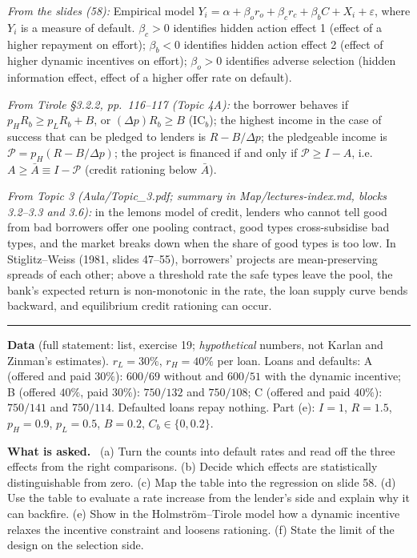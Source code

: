 \documentclass[11pt,a4paper]{article}
\newcommand{\asked}{\par\medskip\noindent\textbf{What is asked.}~}
\newcommand{\stmtend}{\par\endgroup\nopagebreak\noindent\rule{\linewidth}{0.4pt}\par\medskip}
\begin{document}
\emph{From the slides (58):} Empirical model
\(Y_i = \alpha + \beta_o r_o + \beta_c r_c + \beta_b C + X_i + \varepsilon\), where \(Y_i\) is a
measure of default. \(\beta_c > 0\) identifies hidden action effect 1 (effect of a higher repayment
on effort); \(\beta_b < 0\) identifies hidden action effect 2 (effect of higher dynamic incentives
on effort); \(\beta_o > 0\) identifies adverse selection (hidden information effect, effect of a
higher offer rate on default).

\emph{From Tirole §3.2.2, pp.~116--117 (Topic 4A):} the borrower behaves if
\(p_H R_b \ge p_L R_b + B\), or \((\Delta p) R_b \ge B\) (IC\(_b\)); the highest income in the case
of success that can be pledged to lenders is \(R - B/\Delta p\); the pledgeable income is
\(\mathcal P = p_H(R - B/\Delta p)\); the project is financed if and only if
\(\mathcal P \ge I - A\), i.e.~\(A \ge \bar A \equiv I - \mathcal P\) (credit rationing below
\(\bar A\)).

\emph{From Topic 3 (Aula/Topic\_3.pdf; summary in Map/lectures-index.md, blocks 3.2--3.3 and 3.6):}
in the lemons model of credit, lenders who cannot tell good from bad borrowers offer one pooling
contract, good types cross-subsidise bad types, and the market breaks down when the share of good
types is too low. In Stiglitz--Weiss (1981, slides 47--55), borrowers' projects are mean-preserving
spreads of each other; above a threshold rate the safe types leave the pool, the bank's expected
return is non-monotonic in the rate, the loan supply curve bends backward, and equilibrium credit
rationing can occur.
\stmtend

\noindent\textbf{Data} (full statement: list, exercise 19; \emph{hypothetical} numbers, not Karlan and Zinman's estimates).
$r_L=30\%$, $r_H=40\%$ per loan. Loans and defaults: A (offered and paid $30\%$): $600/69$ without and $600/51$ with
the dynamic incentive; B (offered $40\%$, paid $30\%$): $750/132$ and $750/108$; C (offered and paid $40\%$):
$750/141$ and $750/114$. Defaulted loans repay nothing. Part (e): $I=1$, $R=1.5$, $p_H=0.9$, $p_L=0.5$, $B=0.2$, $C_b\in\{0,0.2\}$.

\asked
(a) Turn the counts into default rates and read off the three effects from the right comparisons.
(b) Decide which effects are statistically distinguishable from zero.
(c) Map the table into the regression on slide 58.
(d) Use the table to evaluate a rate increase from the lender's side and explain why it can backfire.
(e) Show in the Holmström--Tirole model how a dynamic incentive relaxes the incentive constraint and loosens rationing.
(f) State the limit of the design on the selection side.
\end{document}
